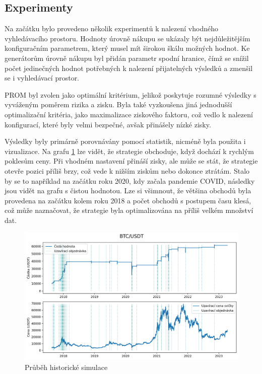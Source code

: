 \subsection{Experimenty}
Na začátku bylo provedeno několik experimentů k nalezení vhodného vyhledávacího prostoru.
Hodnoty úrovně nákupu se ukázaly být nejdůležitějším konfiguračním parametrem, který musel mít širokou škálu možných hodnot.
Ke generátorům úrovně nákupu byl přidán parametr spodní hranice, čímž se snížil počet jedinečných hodnot potřebných k nalezení přijatelných výsledků a zmenšil se i vyhledávací prostor.

PROM byl zvolen jako optimální kritérium, jelikož poskytuje rozumné výsledky s vyváženým poměrem rizika a zisku.
Byla také vyzkoušena jiná jednodušší optimalizační kritéria, jako maximalizace ziskového faktoru, což vedlo k nalezení konfigurací, které byly velmi bezpečné, avšak přinášely nízké zisky.

Výsledky byly primárně porovnávány pomocí statistik, nicméně byla použita i vizualizace.
Na grafu \ref{fig:btc-historical-simulation} lze vidět, že strategie obchoduje, když dochází k rychlým poklesům ceny.
Při vhodném nastavení přináší zisky, ale může se stát, že strategie otevře pozici příliš brzy, což vede k nižším ziskům nebo dokonce ztrátám.
Stalo by se to například na začátku roku 2020, kdy začala pandemie COVID, následky jsou vidět na grafu s čistou hodnotou.
Lze si všimnout, že většina obchodů byla provedena na začátku kolem roku 2018 a počet obchodů s postupem času klesá, což může naznačovat, že strategie byla optimalizována na příliš velkém množství dat.

\begin{figure}[htbp]
\centerline{\includegraphics[width=\textwidth]{img/btc-historical-simulation.png}}
\caption{Průběh historické simulace}
\label{fig:btc-historical-simulation}
\end{figure}

